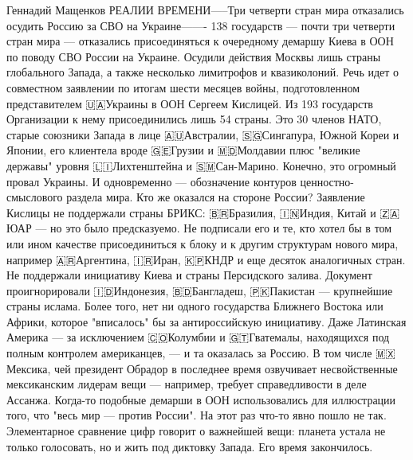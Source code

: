 Геннадий Мащенков
РЕАЛИИ ВРЕМЕНИ-----Три четверти стран мира отказались осудить Россию за СВО на Украине-------
138 государств — почти три четверти стран мира — отказались присоединяться к очередному демаршу Киева в ООН по поводу СВО России на Украине. Осудили действия Москвы лишь страны глобального Запада, а также несколько лимитрофов и квазиколоний.
Речь идет о совместном заявлении по итогам шести месяцев войны, подготовленном представителем 🇺🇦Украины в ООН Сергеем Кислицей. Из 193 государств Организации к нему присоединились лишь 54 страны.
Это 30 членов НАТО, старые союзники Запада в лице 🇦🇺Австралии, 🇸🇬Сингапура, Южной Кореи и Японии, его клиентела вроде 🇬🇪Грузии и 🇲🇩Молдавии плюс "великие державы" уровня 🇱🇮Лихтенштейна и 🇸🇲Сан-Марино.
Конечно, это огромный провал Украины. И одновременно — обозначение контуров ценностно-смыслового раздела мира.
Кто же оказался на стороне России?
Заявление Кислицы не поддержали страны БРИКС: 🇧🇷Бразилия, 🇮🇳Индия, Китай и 🇿🇦ЮАР — но это было предсказуемо.
Не подписали его и те, кто хотел бы в том или ином качестве присоединиться к блоку и к другим структурам нового мира, например 🇦🇷Аргентина, 🇮🇷Иран, 🇰🇵КНДР и еще десяток аналогичных стран.
Не поддержали инициативу Киева и страны Персидского залива. Документ проигнорировали 🇮🇩Индонезия, 🇧🇩Бангладеш, 🇵🇰Пакистан — крупнейшие страны ислама.
Более того, нет ни одного государства Ближнего Востока или Африки, которое "вписалось" бы за антироссийскую инициативу.
Даже Латинская Америка — за исключением 🇨🇴Колумбии и 🇬🇹Гватемалы, находящихся под полным контролем американцев, — и та оказалась за Россию. В том числе 🇲🇽Мексика, чей президент Обрадор в последнее время озвучивает несвойственные мексиканским лидерам вещи — например, требует справедливости в деле Ассанжа.
Когда-то подобные демарши в ООН использовались для иллюстрации того, что "весь мир — против России". На этот раз что-то явно пошло не так.
Элементарное сравнение цифр говорит о важнейшей вещи: планета устала не только голосовать, но и жить под диктовку Запада. Его время закончилось.

